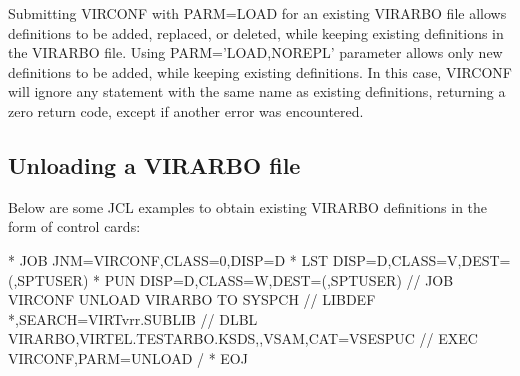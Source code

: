 \documentclass[letterpaper,10pt,english]{sphinxmanual}
\begin{document}
\sphinxAtStartPar
{}

\sphinxAtStartPar
Submitting VIRCONF with PARM=LOAD for an existing VIRARBO file allows definitions to be added, replaced, or deleted, while keeping existing definitions in the VIRARBO file. Using PARM=’LOAD,NOREPL’ parameter allows only new definitions to be added, while keeping existing definitions. In this case, VIRCONF will ignore any statement with the same name as existing definitions, returning a zero return code, except if another error was encountered.

\ignorespaces 

\subsection{Unloading a VIRARBO file}
\label{\detokenize{Installation_Guide:unloading-a-virarbo-file}}\label{\detokenize{Installation_Guide:index-158}}
\sphinxAtStartPar
Below are some JCL examples to obtain existing VIRARBO definitions in the form of control cards:\sphinxhyphen{}

\begin{sphinxVerbatim}[commandchars=\\\{\}]
* \PYGZdl{}\PYGZdl{} JOB JNM=VIRCONF,CLASS=0,DISP=D
* \PYGZdl{}\PYGZdl{} LST DISP=D,CLASS=V,DEST=(,SPTUSER)
* \PYGZdl{}\PYGZdl{} PUN DISP=D,CLASS=W,DEST=(,SPTUSER)
// JOB VIRCONF UNLOAD VIRARBO TO SYSPCH
// LIBDEF *,SEARCH=VIRTvrr.SUBLIB
// DLBL VIRARBO,\PYGZsq{}VIRTEL.TESTARBO.KSDS\PYGZsq{},,VSAM,CAT=VSESPUC
// EXEC VIRCONF,PARM=\PYGZsq{}UNLOAD\PYGZsq{}
/\PYGZam{}
* \PYGZdl{}\PYGZdl{} EOJ
\end{sphinxVerbatim}

\sphinxAtStartPar
{}
\end{document}
